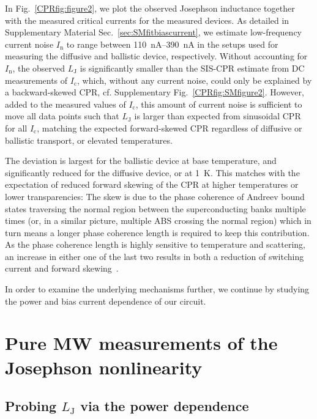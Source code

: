 In Fig.~\ref{CPRfig:figure2}, we plot the observed Josephson inductance together with the measured critical currents for the measured devices.
%
As detailed in Supplementary Material Sec.~\ref{sec:SMfitbiascurrent}, we estimate low-frequency current noise $I_\text{n}$ to range between \SIrange{110}{390}{\nano\ampere} in the setups used for measuring the diffusive and ballistic device, respectively.
%
Without accounting for $I_\text{n}$, the observed $L_\text{J}$ is significantly smaller than the SIS-CPR estimate from DC measurements of $I_\text{c}$, which, without any current noise, could only be explained by a backward-skewed CPR, cf. Supplementary Fig.~\ref{CPRfig:SMfigure2}.
%
However, added to the measured values of $I_\text{c}$, this amount of current noise is sufficient to move all data points such that $L_\text{J}$ is larger than expected from sinusoidal CPR for all $I_\text{c}$, matching the expected forward-skewed CPR regardless of diffusive or ballistic transport, or elevated temperatures.


The deviation is largest for the ballistic device at base temperature, and significantly reduced for the diffusive device, or at \SI{1}{\kelvin}.
%
This matches with the expectation of reduced forward skewing of the CPR at higher temperatures or lower transparencies:
%
The skew is due to the phase coherence of Andreev bound states traversing the normal region between the superconducting banks multiple times (or, in a similar picture, multiple ABS crossing the normal region) which in turn means a longer phase coherence length is required to keep this contribution.
%
As the phase coherence length is highly sensitive to temperature and scattering, an increase in either one of the last two results in both a reduction of switching current and forward skewing~\cite{fuechsleEffectMicrowavesCurrentPhase2009,hagymasiJosephsonCurrentBallistic2010,black-schafferStronglyAnharmonicCurrentphase2010,rakytaMagneticFieldOscillations2016,englishObservationNonsinusoidalCurrentphase2016}.

In order to examine the underlying mechanisms further, we continue by studying the power and bias current dependence of our circuit.



\section{Pure MW measurements of the Josephson nonlinearity}

\subsection{Probing $L_\text{J}$ via the power dependence}

